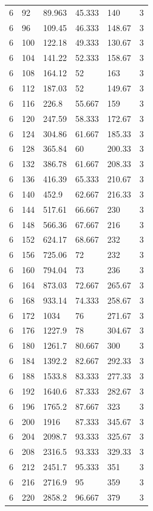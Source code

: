 \begin{tabular}{|p{0.6cm}|p{0.5cm}|p{1.15cm}|p{1cm}|p{1cm}|p{0.7cm}|}
6 & 92 & 89.963 & 45.333 & 140 & 3 \\
6 & 96 & 109.45 & 46.333 & 148.67 & 3 \\
6 & 100 & 122.18 & 49.333 & 130.67 & 3 \\
6 & 104 & 141.22 & 52.333 & 158.67 & 3 \\
6 & 108 & 164.12 & 52 & 163 & 3 \\
6 & 112 & 187.03 & 52 & 149.67 & 3 \\
6 & 116 & 226.8 & 55.667 & 159 & 3 \\
6 & 120 & 247.59 & 58.333 & 172.67 & 3 \\
6 & 124 & 304.86 & 61.667 & 185.33 & 3 \\
6 & 128 & 365.84 & 60 & 200.33 & 3 \\
6 & 132 & 386.78 & 61.667 & 208.33 & 3 \\
6 & 136 & 416.39 & 65.333 & 210.67 & 3 \\
6 & 140 & 452.9 & 62.667 & 216.33 & 3 \\
6 & 144 & 517.61 & 66.667 & 230 & 3 \\
6 & 148 & 566.36 & 67.667 & 216 & 3 \\
6 & 152 & 624.17 & 68.667 & 232 & 3 \\
6 & 156 & 725.06 & 72 & 232 & 3 \\
6 & 160 & 794.04 & 73 & 236 & 3 \\
6 & 164 & 873.03 & 72.667 & 265.67 & 3 \\
6 & 168 & 933.14 & 74.333 & 258.67 & 3 \\
6 & 172 & 1034 & 76 & 271.67 & 3 \\
6 & 176 & 1227.9 & 78 & 304.67 & 3 \\
6 & 180 & 1261.7 & 80.667 & 300 & 3 \\
6 & 184 & 1392.2 & 82.667 & 292.33 & 3 \\
6 & 188 & 1533.8 & 83.333 & 277.33 & 3 \\
6 & 192 & 1640.6 & 87.333 & 282.67 & 3 \\
6 & 196 & 1765.2 & 87.667 & 323 & 3 \\
6 & 200 & 1916 & 87.333 & 345.67 & 3 \\
6 & 204 & 2098.7 & 93.333 & 325.67 & 3 \\
6 & 208 & 2316.5 & 93.333 & 329.33 & 3 \\
6 & 212 & 2451.7 & 95.333 & 351 & 3 \\
6 & 216 & 2716.9 & 95 & 359 & 3 \\
6 & 220 & 2858.2 & 96.667 & 379 & 3 \\

\end{tabular}
